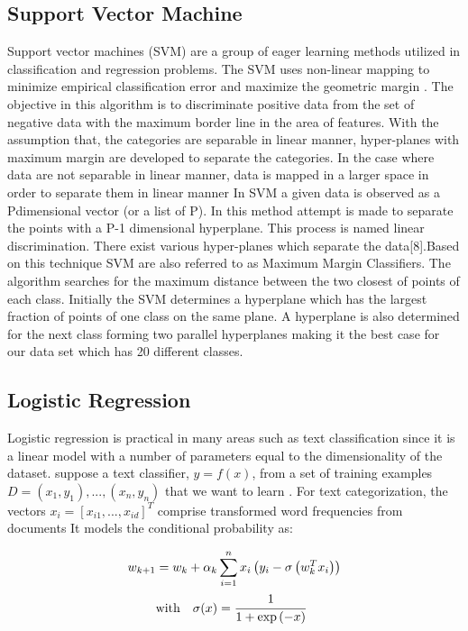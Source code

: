 \documentclass[conference]{IEEEtran}
\begin{document}
\subsection{Support Vector Machine}
Support vector machines (SVM) are a group of eager learning
methods utilized in classification and regression problems.
The SVM uses non-linear mapping to minimize empirical
classification error and maximize the geometric margin \cite{SVM}.
The objective in this algorithm is to discriminate positive data
from the set of negative data with the maximum border
line in the area of features. With the assumption that, the
categories are separable in linear manner, hyper-planes with
maximum margin are developed to separate the categories.
In the case where data are not separable in linear manner,
data is mapped in a larger space in order to separate them
in linear manner \cite{SVM2}
In SVM a given data is observed as a Pdimensional
vector (or a list of P). In this method attempt
is made to separate the points with a P-1 dimensional hyperplane.
This process is named linear discrimination. There exist
various hyper-planes which separate the data[8].Based on this
technique SVM are also referred to as Maximum Margin
Classifiers. The algorithm searches for the maximum distance
between the two closest of points of each class. Initially the
SVM determines a hyperplane which has the largest fraction
of points of one class on the same plane. A hyperplane
is also determined for the next class forming two parallel hyperplanes making it the best case for our data set which has 20 different classes. \cite{SVM2}
\subsection{Logistic Regression}
Logistic regression  is practical in many areas such as text classification since it is a linear model with a number of parameters equal to the dimensionality of the dataset. 
suppose a text classifier, $y = f(x)$, from a set of
training examples $D = {(x_1, y_1), . . . ,(x_n, y_n)}$ that we want to learn .
For text categorization, the vectors $x_i = [x_{i1}, ..., x_{id}]^T$ comprise transformed word frequencies from documents
It models the conditional probability as:

\begin{align}
	w_{k+1} &= w_k + \alpha_k\sum_{i=1}^nx_i\left(y_i-\sigma\left(w_k^Tx_i\right)\right)\label{loggrad}\\
	&\text{with}\quad\sigma(x)=\cfrac{1}{1+\exp{(-x)}}\nonumber
	\end{align}
\end{document}
